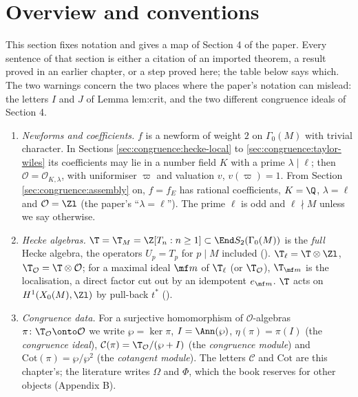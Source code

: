 \section{Overview and conventions}\label{sec:congruence:overview}

This section fixes notation and gives a map of Section 4 of the paper. Every sentence of that section is either a citation of an imported
theorem, a result proved in an earlier chapter, or a step proved here; the table below says which. The two warnings concern the two places where
the paper's notation can mislead: the letters $I$ and $J$ of Lemma lem:crit, and the two different congruence ideals of Section 4.

\begin{convention}\label{conv:congruence:setup}
\begin{enumerate}[label=(\alph*)]
\item \emph{Newforms and coefficients.} $f$ is a newform of weight $2$ on $\Gamma_0(M)$ with trivial character. In Sections \ref{sec:congruence:hecke-local} to
\ref{sec:congruence:taylor-wiles} its coefficients may lie in a number field $K$ with a prime $\lambda\mid\ell$; then $\mathcal O=\mathcal O_{K,\lambda}$, with uniformiser $\varpi$ and
valuation $v$, $v(\varpi)=1$. From Section \ref{sec:congruence:assembly} on, $f=f_E$ has rational coefficients, $K=\Q$, $\lambda=\ell$ and $\mathcal O=\Zl$ (the paper's
``$\lambda=\ell$''). The prime $\ell$ is odd and $\ell\nmid M$ unless we say otherwise.
\item \emph{Hecke algebras.} $\T=\T_M=\Z[T_n:n\ge1]\subset\End S_2(\Gamma_0(M))$ is the \emph{full} Hecke algebra, the operators $U_p=T_p$ for $p\mid M$ included
(). $\T_\ell=\T\otimes\Zl$, $\T_{\mathcal O}=\T\otimes\mathcal O$; for a maximal ideal $\mf m$ of $\T_\ell$ (or $\T_{\mathcal O}$), $\T_{\mf m}$ is the localisation, a direct factor
cut out by an idempotent $e_{\mf m}$. $\T$ acts on $H^1(X_0(M),\Zl)$ by pull-back $t^*$ ().
\item \emph{Congruence data.} For a surjective homomorphism of $\mathcal O$-algebras $\pi\colon\T_{\mathcal O}\onto\mathcal O$ we write $\wp=\ker\pi$, $I=\Ann(\wp)$, $\eta(\pi)=\pi(I)$ (the
\emph{congruence ideal}), $\mathcal C(\pi)=\T_{\mathcal O}/(\wp+I)$ (the \emph{congruence module}) and $\mathrm{Cot}(\pi)=\wp/\wp^2$ (the \emph{cotangent module}). The letters
$\mathcal C$ and $\mathrm{Cot}$ are this chapter's; the literature writes $\Omega$ and $\Phi$, which the book reserves for other objects (Appendix B).

\end{enumerate}
\end{convention}
